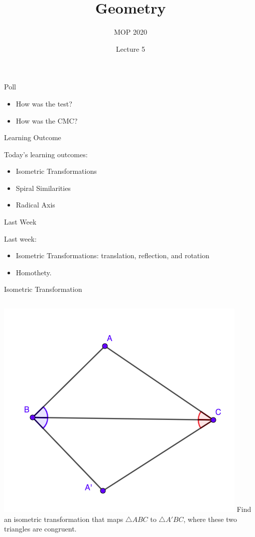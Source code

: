 \documentclass{beamer}
\title{Geometry}
\subtitle{MOP 2020}
\author{Lecture 5}
\begin{document}
\titlepage
\begin{frame}{Poll}
	\Large{
	\begin{itemize}
		\setlength\itemsep{20pt}
		\item How was the test?
		\item How was the CMC?
	\end{itemize}
	}
\end{frame}

\begin{frame}{Learning Outcome}
	\Large{Today's learning outcomes:\\
	\phantom{Spacing}
	\begin{itemize}
		\setlength\itemsep{30pt}
		\item Isometric Transformations
		\item Spiral Similarities
		\item Radical Axis
	\end{itemize}
	}
\end{frame}
\begin{frame}{Last Week}
	\Large{Last week:\\
		\phantom{Spacing}
		\begin{itemize}
			\setlength\itemsep{20pt}
			\item Isometric Transformations: translation,
				reflection, and rotation
			\item Homothety.
		\end{itemize}
	}
\end{frame}
\begin{frame}{Isometric Transformation}
	\begin{columns}
		\includegraphics[scale=0.4]{iso1.png}
		Find an isometric transformation that maps $\triangle
		ABC$ to $\triangle A'BC$, where these two triangles
		are congruent.
	\end{columns}
\end{frame}
\end{document}
